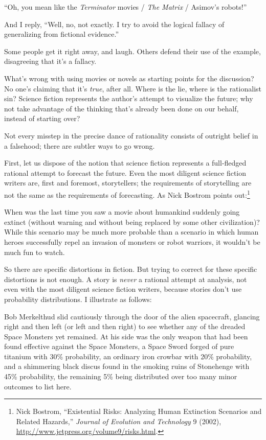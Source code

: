 {
 ``Oh, you mean like the \textit{Terminator}
movies / \textit{The Matrix} / Asimov's
robots!''}

{
 And I reply, ``Well, no, not exactly. I try to
avoid the logical fallacy of generalizing from fictional
evidence.''}

{
 Some people get it right away, and laugh. Others defend their use
of the example, disagreeing that it's a fallacy.}

{
 What's wrong with using movies or novels as
starting points for the discussion? No one's claiming
that it's \textit{true}, after all. Where is the lie,
where is the rationalist sin? Science fiction represents the
author's attempt to visualize the future; why not take
advantage of the thinking that's already been done on
our behalf, instead of starting over?}

{
 Not every misstep in the precise dance of rationality consists of
outright belief in a falsehood; there are subtler ways to go wrong.}

{
 First, let us dispose of the notion that science fiction
represents a full-fledged rational attempt to forecast the future. Even
the most diligent science fiction writers are, first and foremost,
storytellers; the requirements of storytelling are not the same as the
requirements of forecasting. As Nick Bostrom points
out:\footnote{Nick Bostrom, ``Existential Risks: Analyzing
Human Extinction Scenarios and Related Hazards,''
\textit{Journal of Evolution and Technology} 9 (2002),
\url{http://www.jetpress.org/volume9/risks.html}.}}

{
 When was the last time you saw a movie about humankind suddenly
going extinct (without warning and without being replaced by some other
civilization)? While this scenario may be much more probable than a
scenario in which human heroes successfully repel an invasion of
monsters or robot warriors, it wouldn't be much fun to
watch.}

{
 So there are specific distortions in fiction. But trying to
correct for these specific distortions is not enough. A story is
\textit{never} a rational attempt at analysis, not even with the most
diligent science fiction writers, because stories don't
use probability distributions. I illustrate as follows:}

{
 Bob Merkelthud slid cautiously through the door of the alien
spacecraft, glancing right and then left (or left and then right) to
see whether any of the dreaded Space Monsters yet remained. At his side
was the only weapon that had been found effective against the Space
Monsters, a Space Sword forged of pure titanium with 30\% probability,
an ordinary iron crowbar with 20\% probability, and a shimmering black
discus found in the smoking ruins of Stonehenge with 45\% probability,
the remaining 5\% being distributed over too many minor outcomes to
list here.}

